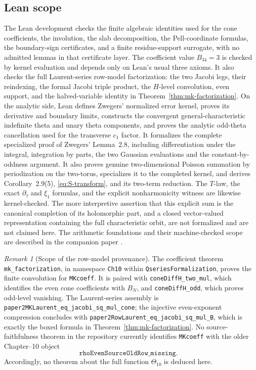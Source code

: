 \documentclass[12pt]{amsart}
\theoremstyle{definition}
\theoremstyle{remark}
\newtheorem{remark}[theorem]{Remark}
\begin{document}
\subsection{Lean scope}
The Lean development checks the finite algebraic identities used for
the cone coefficients, the involution, the slab decomposition, the
Pell-coordinate formulas, the boundary-sign certificates, and a
finite residue-support surrogate, with no admitted lemmas in that
certificate layer.  The coefficient value $B_{34}=3$ is checked by
kernel evaluation and depends only on Lean's usual three axioms.  It
also checks the full Laurent-series row-model factorization: the two
Jacobi legs, their reindexing, the formal Jacobi triple product, the
$H$-level convolution, even support, and the halved-variable identity
in Theorem~\ref{thm:mk-factorization}.  On the analytic side, Lean
defines Zwegers' normalized error kernel, proves its derivative and
boundary limits, constructs the convergent general-characteristic
indefinite theta and unary theta components, and proves the analytic
odd-theta cancellation used for the transverse $c_1$ factor.  It
formalizes the complete specialized proof of Zwegers' Lemma~2.8,
including differentiation under the integral, integration by parts,
the two Gaussian evaluations and the constant-by-oddness argument.
It also proves genuine two-dimensional Poisson summation by
periodization on the two-torus, specializes it to the completed kernel,
and derives Corollary~2.9(5), \eqref{eq:S-transform}, and its two-term
reduction.  The $T$-law, the exact $\partial_{\overline\tau}$ and
$\xi_1$ formulas, and the explicit nonharmonicity witness are likewise
kernel-checked.  The more interpretive assertion that this explicit
sum is the canonical completion of its holomorphic part, and a closed
vector-valued representation containing the full characteristic
orbit, are not formalized and are not claimed here.
The arithmetic foundations and their machine-checked scope are
described in the companion paper \cite{companion}.

\begin{remark}[Scope of the row-model provenance]
The coefficient theorem \texttt{mk\_factorization}, in namespace
\texttt{Ch10} within \texttt{QseriesFormalization}, proves the finite
convolution for \texttt{MKcoeff}.  It is paired with
\texttt{coneDiffH\_two\_mul}, which identifies the even cone
coefficients with $B_N$, and \texttt{coneDiffH\_odd}, which proves
odd-level vanishing.  The Laurent-series assembly is
\texttt{paper2MKLaurent\_eq\_jacobi\_sq\_mul\_cone}; the injective
even-exponent compression concludes with
\texttt{paper2RowLaurent\_eq\_jacobi\_sq\_mul\_B}, which is exactly
the boxed formula in Theorem~\ref{thm:mk-factorization}.  No
source-faithfulness theorem in the repository currently identifies
\texttt{MKcoeff} with the older
Chapter--10 object
\[
  \texttt{rhoEvenSourceOldRow\_missing}.
\]
Accordingly, no theorem about the full function $\Theta_{10}$ is
deduced here.
\end{remark}
\end{document}
